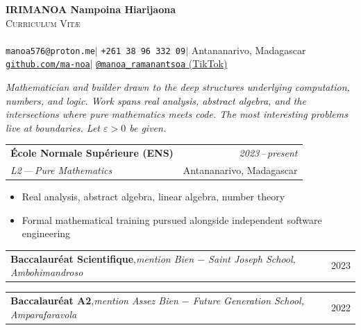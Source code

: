 \documentclass[9.5pt, a4paper]{article}
\makeatletter
\newcounter{cvsec}
\newcommand{\cvsection}[1]{%
	\stepcounter{cvsec}%
	\vspace{1pt}%
	\noindent{\large\textbf{\S\,\thecvsec.\enspace\textsc{#1}}}%
	\vspace{1pt}%
	\newline\noindent{\color{rule}\rule{\linewidth}{0.5pt}}%
	\vspace{1pt}%
}
\newcommand{\cventry}[4]{%
	\noindent
	\begin{tabularx}{\linewidth}{@{}X r@{}}
		\textbf{#1} & \textit{\small #2} \\
		\textit{\small\color{mid}#3} & {\small\color{soft} #4}
	\end{tabularx}%
}
\newcommand{\cventryshort}[3]{%
	\noindent
	\begin{tabularx}{\linewidth}{@{}X r@{}}
		\textbf{#1},\enspace\textit{\small\color{mid}#2} & {\small\color{soft}#3}
	\end{tabularx}%
}
\theoremstyle{cvnote}
\makeatother
\begin{document}
	
	\begin{center}
		{\LARGE\textbf{IRIMANOA Nampoina Hiarijaona}}\\[2pt]
		{\small\textsc{Curriculum Vit\ae}}\\[3pt]
		\noindent{\color{rule}\rule{0.6\linewidth}{0.4pt}}\\[3pt]
		{\small
			\texttt{manoa576@proton.me}\enspace$\mid$\enspace
			\texttt{+261 38 96 332 09}\enspace$\mid$\enspace
			Antananarivo, Madagascar\\[3pt]
			\href{https://github.com/ma-noa}{\texttt{github.com/ma-noa}}\enspace$\mid$\enspace
			\href{https://tiktok.com/@manoa_ramanantsoa}{\texttt{@manoa\_ramanantsoa} (TikTok)}
		}
	\end{center}
	
	\vspace{1pt}
	
	\begin{mdframed}[
		backgroundcolor=boxbg,
		linecolor=rule,
		linewidth=0.5pt,
		innertopmargin=5pt,
		innerbottommargin=5pt,
		innerleftmargin=10pt,
		innerrightmargin=10pt,
		skipabove=2pt,
		skipbelow=2pt
		]
		\textit{Mathematician and builder drawn to the deep structures underlying computation, numbers,
			and logic. Work spans real analysis, abstract algebra, and the intersections where pure
			mathematics meets code. The most interesting problems live at boundaries.
			Let $\varepsilon > 0$ be given.}
	\end{mdframed}
	
	\cvsection{Education}
	
	\cventry{\'Ecole Normale Sup\'erieure (ENS)}{2023\,--\,present}%
	{L2\,---\,Pure Mathematics}{Antananarivo, Madagascar}
	\begin{itemize}
		\item Real analysis, abstract algebra, linear algebra, number theory
		\item Formal mathematical training pursued alongside independent software engineering
	\end{itemize}
	
	\vspace{2pt}
	\cventryshort{Baccalaur\'eat Scientifique}{mention \textit{Bien} $-$ Saint Joseph School, Ambohimandroso}{2023}
	
	\vspace{2pt}
	\cventryshort{Baccalaur\'eat A2}{mention \textit{Assez Bien} $-$ Future Generation School, Amparafaravola}{2022}
	
\end{document}
